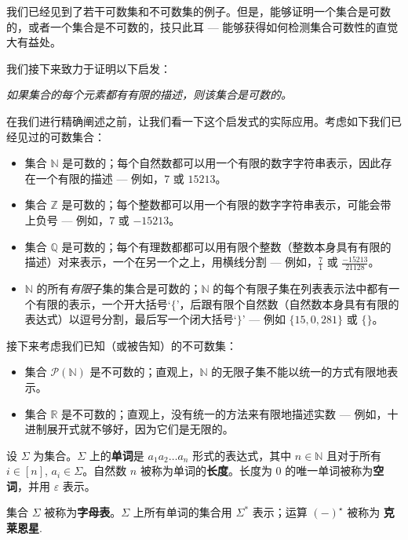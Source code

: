 我们已经见到了若干可数集和不可数集的例子。但是，能够证明一个集合是可数的，或者一个集合是不可数的，技只此耳 --- 能够获得如何检测集合可数性的直觉大有益处。

我们接下来致力于证明以下启发：

\begin{center}
\textit{如果集合的每个元素都有有限的描述，则该集合是可数的。}
\end{center}

在我们进行精确阐述之前，让我们看一下这个启发式的实际应用。考虑如下我们已经见过的可数集合：
\begin{itemize}
\item 集合 $\mathbb{N}$ 是可数的；每个自然数都可以用一个有限的数字字符串表示，因此存在一个有限的描述 --- 例如，$7$ 或 $15213$。
\item 集合 $\mathbb{Z}$ 是可数的；每个整数都可以用一个有限的数字字符串表示，可能会带上负号 --- 例如，$7$ 或 $-15213$。
\item 集合 $\mathbb{Q}$ 是可数的；每个有理数都都可以用有限个整数（整数本身具有有限的描述）对来表示，一个在另一个之上，用横线分割 --- 例如，$\frac{7}{1}$ 或 $\frac{-15213}{21128}$。
\item $\mathbb{N}$ 的所有\textit{有限}子集的集合是可数的；$\mathbb{N}$ 的每个有限子集在列表表示法中都有一个有限的表示，一个开大括号`$\{$'，后跟有限个自然数（自然数本身具有有限的表达式）以逗号分割，最后写一个闭大括号`$\}$' --- 例如 $\{ 15, 0, 281 \}$ 或 $\{ \}$。
\end{itemize}

接下来考虑我们已知（或被告知）的不可数集：
\begin{itemize}
\item 集合 $\mathcal{P}(\mathbb{N})$ 是不可数的；直观上，$\mathbb{N}$ 的无限子集不能以统一的方式有限地表示。 
\item 集合 $\mathbb{R}$ 是不可数的；直观上，没有统一的方法来有限地描述实数 --- 例如，十进制展开式就不够好，因为它们是无限的。
\end{itemize}

\begin{definition}
\label{defKleeneStar}
设 $\Sigma$ 为集合。$\Sigma$ 上的\textbf{单词}是 $a_1 a_2 \dots a_n$ 形式的表达式，其中 $n \in \mathbb{N}$ 且对于所有 $i \in [n]$, $a_i \in \Sigma$。自然数 $n$ 被称为单词的\textbf{长度}。长度为 $0$ 的唯一单词被称为\textbf{空词}，并用 $\varepsilon$  表示。

集合 $\Sigma$ 被称为\textbf{字母表}。$\Sigma$ 上所有单词的集合用 $\Sigma^*$  表示；运算 $(-)^{\star}$ 被称为 \textbf{克莱恩星}.
\end{definition}

